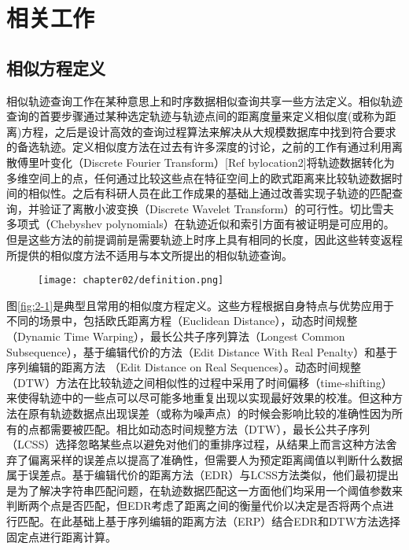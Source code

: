 
\chapter{ 相关工作 }
\label{chap:related}

\section{相似方程定义}
\label{sec:similarityfunc}
相似轨迹查询工作在某种意思上和时序数据相似查询共享一些方法定义。相似轨迹查询的首要步骤通过某种选定轨迹与轨迹点间的距离度量来定义相似度(或称为距离)方程，之后是设计高效的查询过程算法来解决从大规模数据库中找到符合要求的备选轨迹。定义相似度方法在过去有许多深度的讨论，之前的工作有通过利用离散傅里叶变化（Discrete Fourier Transform）[Ref bylocation2]将轨迹数据转化为多维空间上的点，任何通过比较这些点在特征空间上的欧式距离来比较轨迹数据时间的相似性。之后有科研人员在此工作成果的基础上通过改善实现子轨迹的匹配查询，并验证了离散小波变换（Discrete Wavelet Transform）的可行性。切比雪夫多项式（Chebyshev polynomials）在轨迹近似和索引方面有被证明是可应用的。但是这些方法的前提调前是需要轨迹上时序上具有相同的长度，因此这些转变返程所提供的相似度方法不适用与本文所提出的相似轨迹查询。
\\

\begin{figure}[!htp]
  \centering
  \texttt{[image: chapter02/definition.png]}
\end{figure}

图\ref{fig:2-1}是典型且常用的相似度方程定义。这些方程根据自身特点与优势应用于不同的场景中，包括欧氏距离方程（Euclidean Distance），动态时间规整（Dynamic Time Warping），最长公共子序列算法（Longest Common Subsequence），基于编辑代价的方法（Edit Distance With Real Penalty）和基于序列编辑的距离方法 （Edit Distance on Real Sequences）。动态时间规整（DTW）方法在比较轨迹之间相似性的过程中采用了时间偏移（time-shifting）来使得轨迹中的一些点可以尽可能多地重复出现以实现最好效果的校准。但这种方法在原有轨迹数据点出现误差（或称为噪声点）的时候会影响比较的准确性因为所有的点都需要被匹配。相比如动态时间规整方法（DTW），最长公共子序列（LCSS）选择忽略某些点以避免对他们的重排序过程，从结果上而言这种方法舍弃了偏离采样的误差点以提高了准确性，但需要人为预定距离阈值以判断什么数据属于误差点。基于编辑代价的距离方法（EDR）与LCSS方法类似，他们最初提出是为了解决字符串匹配问题，在轨迹数据匹配这一方面他们均采用一个阈值参数来判断两个点是否匹配，但EDR考虑了距离之间的衡量代价以决定是否将两个点进行匹配。在此基础上基于序列编辑的距离方法（ERP）结合EDR和DTW方法选择固定点进行距离计算。


